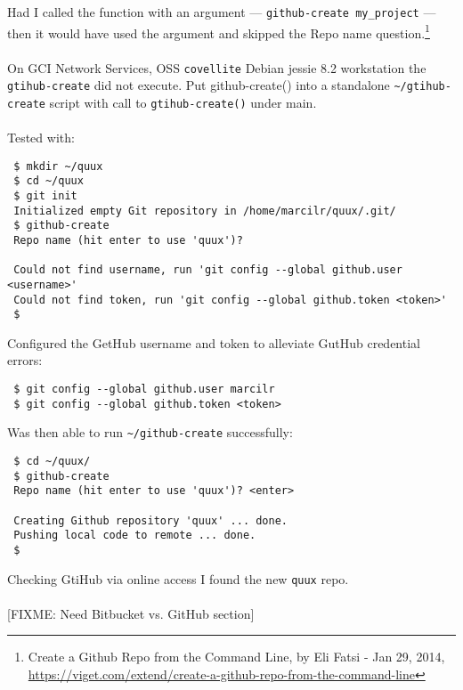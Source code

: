 \documentclass[12pt,letterpaper,dvips]{article}
\newcommand{\FIXME}[1]{\textsf{[FIXME: #1]}}
\newcommand{\cmd}[1]{\texttt{#1}}
\begin{document}
\noindent Had I called the function with an argument — \cmd{github-create my\_project} —
then it would have used the argument and skipped the Repo name question.\footnote{Create a Github Repo
from the Command Line, by Eli Fatsi - Jan 29, 2014,\\
\href{https://viget.com/extend/create-a-github-repo-from-the-command-line}{https://viget.com/extend/create-a-github-repo-from-the-command-line}}
\\
\\
On GCI Network Services, OSS \cmd{covellite} Debian jessie 8.2
workstation the \cmd{gtihub-create} did not execute.  Put
github-create() into a standalone \cmd{\textasciitilde/gtihub-create}
script with call to \cmd{gtihub-create()} under main.
\\
\\
Tested with:
\begin{Verbatim}
 $ mkdir ~/quux
 $ cd ~/quux
 $ git init
 Initialized empty Git repository in /home/marcilr/quux/.git/
 $ github-create 
 Repo name (hit enter to use 'quux')?

 Could not find username, run 'git config --global github.user <username>'
 Could not find token, run 'git config --global github.token <token>'
 $
\end{Verbatim}

\newpage
\noindent Configured the GetHub username and token to alleviate GutHub credential errors:
\begin{Verbatim}
 $ git config --global github.user marcilr
 $ git config --global github.token <token>
\end{Verbatim}

\noindent Was then able to run \cmd{\textasciitilde/github-create} successfully:
\begin{Verbatim}
 $ cd ~/quux/
 $ github-create
 Repo name (hit enter to use 'quux')? <enter>

 Creating Github repository 'quux' ... done.
 Pushing local code to remote ... done.
 $
\end{Verbatim}

\noindent Checking GtiHub via online access I found the new \cmd{quux} repo.
\\
\\
\noindent \FIXME{Need Bitbucket vs. GitHub section}



\end{document}

